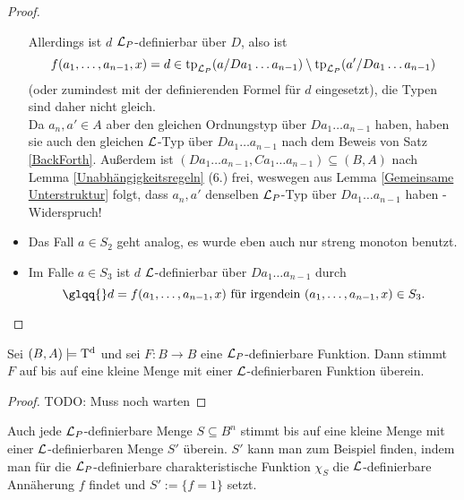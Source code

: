 \begin{proof}
\begin{itemize}
		Allerdings ist $d$ $\mathcal{L}_P$-definierbar über $D$, also ist $$f(a_1,\dots,a_{n-1},x)=d\in\operatorname{tp}_{\mathcal{L}_P}(a/Da_1\dots a_{n-1})\setminus\operatorname{tp}_{\mathcal{L}_P}(a'/Da_1\dots a_{n-1})$$ (oder zumindest mit der definierenden Formel für $d$ eingesetzt), die Typen sind daher nicht gleich.\\
		Da $a_n,a'\in A$ aber den gleichen Ordnungstyp über $Da_1\dots a_{n-1}$ haben, haben sie auch den gleichen $\mathcal{L}$-Typ über $Da_1\dots a_{n-1}$ nach dem Beweis von Satz \ref{BackForth}. Außerdem ist $(Da_1\dots a_{n-1},Ca_1\dots a_{n-1})\subseteq(B,A)$ nach Lemma \ref{Unabhängigkeitsregeln} (6.) frei, weswegen aus Lemma \ref{Gemeinsame Unterstruktur} folgt, dass $a_n,a'$ denselben $\mathcal{L}_P$-Typ über $Da_1\dots a_{n-1}$ haben - Widerspruch!
		\item Das Fall $a\in S_2$ geht analog, es wurde eben auch nur streng monoton benutzt.
		\item Im Falle $a\in S_3$ ist $d$ $\mathcal{L}$-definierbar über $Da_1\dots a_{n-1}$ durch $$\glqq{}d=f(a_1,\dots,a_{n-1},x)\text{ für irgendein }(a_1,\dots,a_{n-1},x)\in S_3.$$
	\end{itemize}
\end{proof}


\begin{theorem}\label{Satz 3}
	Sei $(B,A)\models\operatorname{T^d}$ und sei $F:B\rightarrow B$ eine $\mathcal{L}_P$-definierbare Funktion. Dann stimmt $F$ auf bis auf eine kleine Menge mit einer $\mathcal{L}$-definierbaren Funktion überein.
\end{theorem}
\begin{proof}
	TODO: Muss noch warten
\end{proof}
\begin{corollary}
	Auch jede $\mathcal{L}_P$-definierbare Menge $S\subseteq B^n$ stimmt bis auf eine kleine Menge mit einer $\mathcal{L}$-definierbaren Menge $S'$ überein. $S'$ kann man zum Beispiel finden, indem man für die $\mathcal{L}_P$-definierbare charakteristische Funktion $\chi_S$ die $\mathcal{L}$-definierbare Annäherung $f$ findet und $S':=\{f=1\}$ setzt.
\end{corollary}

